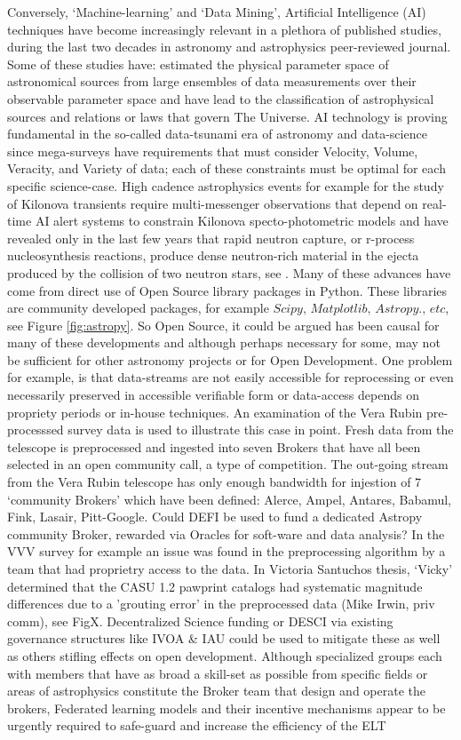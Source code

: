 \documentclass[final,5p,times,twocolumn,authoryear]{elsarticle}
\begin{document}
Conversely,  `Machine-learning' and `Data Mining', Artificial Intelligence (AI) techniques have become increasingly relevant in a plethora of published studies, during the last two decades in astronomy and astrophysics peer-reviewed journal. Some of these studies have: estimated the physical parameter space of astronomical sources from large ensembles of data measurements over their observable parameter space and have lead to the classification of astrophysical sources and relations or laws that govern The Universe. AI technology is proving fundamental in the so-called data-tsunami era of astronomy and data-science since mega-surveys have requirements that must consider Velocity, Volume, Veracity, and Variety of data; each of these constraints must be optimal for each specific science-case. High cadence astrophysics events for example for the study of Kilonova transients require multi-messenger observations that depend on real-time AI alert systems to constrain Kilonova specto-photometric models and have revealed only in the last few years that rapid neutron capture, or r-process nucleosynthesis reactions, produce dense neutron-rich material in the ejecta produced by the collision of two neutron stars, see \cite{artola2020}. Many of these advances have come from direct use of Open Source library packages in Python. These libraries are community developed packages, for example $\textit{Scipy, Matplotlib, Astropy., etc}$, see Figure \ref{fig:astropy}. So Open Source, it could be argued has been causal for many of these developments and although perhaps necessary for some, may not be sufficient for other astronomy projects or for Open Development. One problem for example, is that data-streams are not easily accessible for reprocessing or even necessarily preserved in accessible verifiable form or data-access depends on propriety periods or in-house techniques. An examination of the Vera Rubin pre-processsed survey data is used to illustrate this case in point. Fresh data from the telescope is preprocessed and ingested into seven Brokers that have all been selected in an open community call, a type of competition.  The out-going stream from the Vera Rubin telescope has only enough bandwidth for injestion of 7 `community Brokers' which have been defined: Alerce, Ampel, Antares, Babamul, Fink, Lasair, Pitt-Google. Could DEFI be used to fund a dedicated Astropy community Broker, rewarded via Oracles for soft-ware and data analysis? In the VVV survey for example an issue was found in the preprocessing algorithm by a team that had proprietry access to the data. In Victoria Santuchos thesis, `Vicky' determined that the CASU 1.2 pawprint catalogs had systematic magnitude differences due to a 'grouting error' in the preprocessed data (Mike Irwin, priv comm), see FigX. Decentralized Science funding or DESCI via existing governance structures like IVOA \& IAU could be used to mitigate these as well as others stifling effects on open development. Although specialized groups each with members that have as broad a skill-set as possible from specific fields or areas of astrophysics constitute the Broker team that  design and operate the brokers, Federated learning models and their incentive mechanisms appear to be urgently required to safe-guard and increase the efficiency of the  ELT 
\end{document}
